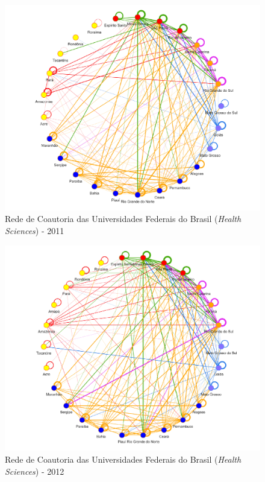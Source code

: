 \begin{figure}[H]
	\centering
	\includegraphics[width=\linewidth]{Imagens/rede-2011.pdf}
	\caption{Rede de Coautoria das Universidades Federais do Brasil (\textit{Health Sciences}) - 2011}
	\label{Rede de Coautoria - UF BR 2011}
\end{figure}


\begin{figure}[H]
	\centering
	\includegraphics[width=\linewidth]{Imagens/rede-2012.pdf}
	\caption{Rede de Coautoria das Universidades Federais do Brasil (\textit{Health Sciences}) - 2012}
	\label{Rede de Coautoria - UF BR 2012}
\end{figure}

